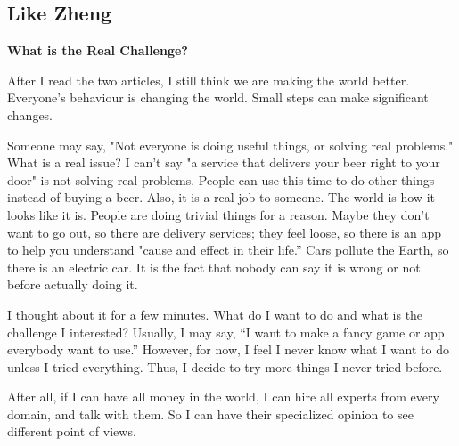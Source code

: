 \documentclass[12pt,letterpaper]{article}
\begin{document}
\subsection{Like Zheng}
\textbf{What is the Real Challenge?}\par
After I read the two articles, I still think we are making the world better. Everyone's behaviour is changing the world. Small steps can make significant changes. \par
Someone may say, "Not everyone is doing useful things, or solving real problems." What is a real issue? I can't say "a service that delivers your beer right to your door" is not solving real problems. People can use this time to do other things instead of buying a beer. Also, it is a real job to someone. The world is how it looks like it is. People are doing trivial things for a reason. Maybe they don't want to go out, so there are delivery services; they feel loose, so there is an app to help you understand "cause and effect in their life.” Cars pollute the Earth, so there is an electric car. It is the fact that nobody can say it is wrong or not before actually doing it.\par
I thought about it for a few minutes. What do I want to do and what is the challenge I interested? Usually, I may say, “I want to make a fancy game or app everybody want to use.” However, for now, I feel I never know what I want to do unless I tried everything. Thus, I decide to try more things I never tried before.\par
After all, if I can have all money in the world, I can hire all experts from every domain, and talk with them. So I can have their specialized opinion to see different point of views. 

\clearpage
\end{document}
